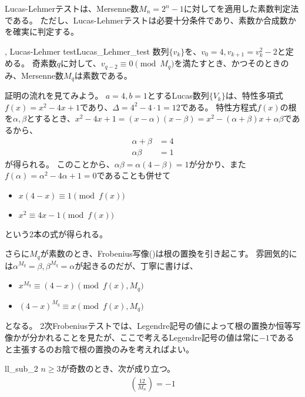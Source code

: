 Lucas-Lehmerテストは、Mersenne数$M_n=2^n-1$に対してを適用した素数判定法である。
ただし、Lucas-Lehmerテストは必要十分条件であり、素数か合成数かを確実に判定する。

\begin{Theo}{, Lucas-Lehmer test}{Lucas_Lehmer_test}
数列$\{v_k\}$を、$v_0=4,v_{k+1}=v_k^2-2$と定める。
奇素数$q$に対して、$v_{q-2} \equiv 0 \pmod{M_q}$を満たすとき、かつそのときのみ、Mersenne数$M_q$は素数である。
\end{Theo}

証明の流れを見てみよう。
$a=4,b=1$とするLucas数列$\{V_k\}$は、特性多項式$f(x)=x^2-4x+1$であり、$\Delta=4^2-4\cdot1=12$である。
特性方程式$f(x)$の根を$\alpha,\beta$とするとき、$x^2-4x+1=(x-\alpha)(x-\beta)=x^2-(\alpha+\beta)x+\alpha\beta$であるから、
\begin{align*}
\alpha + \beta &= 4\\
\alpha\beta &= 1
\end{align*}
が得られる。
このことから、$\alpha\beta=\alpha(4-\beta)=1$が分かり、また$f(\alpha) = \alpha^2 - 4\alpha + 1 = 0$であることも併せて
\begin{itemize}
\item $x(4-x)\equiv1\pmod{f(x)}$
\item $x^2 \equiv 4x - 1 \pmod{f(x)}$
\end{itemize}
という2本の式が得られる。

さらに$M_q$が素数のとき、Frobenius写像()は根の置換を引き起こす。
雰囲気的には$\alpha^{M_q}=\beta,\beta^{M_q}=\alpha$が起きるのだが、丁寧に書けば、
\begin{itemize}
\item $x^{M_q} \equiv (4 - x) \pmod{f(x),M_q}$
\item $(4-x)^{M_q} \equiv x \pmod{f(x),M_q}$
\end{itemize}
となる。
2次Frobeniusテストでは、Legendre記号の値によって根の置換か恒等写像かが分かれることを見たが、ここで考えるLegendre記号の値は常に$-1$であると主張するのお陰で根の置換のみを考えればよい。

\begin{Prop}{}{ll_sub_2}
$n\ge3$が奇数のとき、次が成り立つ。
\begin{align*}
\left(\frac{12}{M_n}\right)=-1
\end{align*}
\end{Prop}

